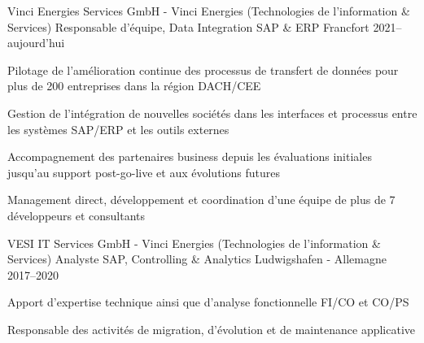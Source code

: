 

\begin{cventries}
  \cventry
    {Vinci Energies Services GmbH - Vinci Energies (Technologies de l'information \& Services)} %
    {Responsable d'équipe, Data Integration SAP \& ERP} %
    {Francfort} %
    {2021--aujourd'hui} %
    {
      \begin{cvitems} %
        \item {Pilotage de l'amélioration continue des processus de transfert de données pour plus de 200 entreprises dans la région DACH/CEE}
        \item {Gestion de l'intégration de nouvelles sociétés dans les interfaces et processus entre les systèmes SAP/ERP et les outils externes}
        \item {Accompagnement des partenaires business depuis les évaluations initiales jusqu'au support post-go-live et aux évolutions futures}
        \item {Management direct, développement et coordination d'une équipe de plus de 7 développeurs et consultants}
      \end{cvitems}
    }

  \cventry
    {VESI IT Services GmbH - Vinci Energies (Technologies de l'information \& Services)} %
    {Analyste SAP, Controlling \& Analytics} %
    {Ludwigshafen - Allemagne} %
    {2017--2020} %
    {
      \begin{cvitems} %
        \item {Apport d'expertise technique ainsi que d'analyse fonctionnelle FI/CO et CO/PS}
        \item {Responsable des activités de migration, d'évolution et de maintenance applicative}
      \end{cvitems}
    }


\end{cventries}
